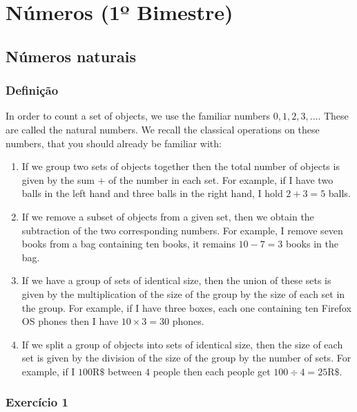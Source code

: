 \chapter{Números (1º Bimestre)}

\section{Números naturais}

\subsection*{Definição}

In order to count a set of objects, we use the familiar numbers
$0, 1, 2, 3, \dots$. These are called the natural numbers.
We recall the classical operations on these numbers, that you should already be
familiar with:

\begin{enumerate}

\item If we group two sets of objects together then the total number of objects
  is given by the sum $+$ of the number in each set. For example, if I have
  two balls in the left hand and three balls in the right hand, I hold
  $2+3=5$ balls.

\item If we remove a subset of objects from a given set, then we obtain the
  subtraction of the two corresponding numbers. For example, I remove seven
  books from a bag containing ten books, it remains $10-7 = 3$ books in the bag.

\item If we have a group of sets of identical size, then the union of these
  sets is given by the multiplication of the size of the group by the size
  of each set in the group. For example, if I have three boxes, each one
  containing ten Firefox OS phones then I have $10 \times 3 = 30$ phones.

\item If we split a group of objects into sets of identical size, then
  the size of each set is given by the division of the size of the group by
  the number of sets. For example, if I $100 \text{R\$}$ between $4$ people
  then each people get $100 \div  4 = 25 \text{R\$}$.

\end{enumerate}

\subsection*{Exercício 1}


